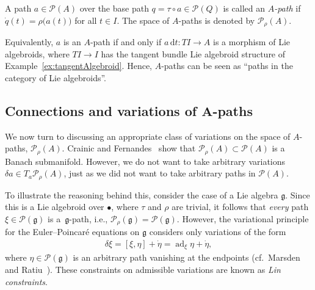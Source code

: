 \documentclass[10pt,a4paper]{amsart}
\numberwithin{equation}{section}
\begin{document}
\begin{Definition} \label{def:a-path}
A path $ a \in \mathcal{P} (A) $ over the base path $ q = \tau \circ a \in \mathcal{P} (Q) $ is called an \emph{$A$-path} if $ \dot{q} (t) = \rho \bigl( a (t) \bigr) $ for all $ t \in I $. The space of $A$-paths is denoted by $ \mathcal{P} _\rho (A) $.
\end{Definition}

\begin{Remark}
Equivalently, $a$ is an $A$-path if and only if $ a \,\mathrm{d}t \colon T I \rightarrow A $ is a morphism of Lie algebroids, where $ T I \rightarrow I $ has the tangent bundle Lie algebroid structure of Example~\ref{ex:tangentAlgebroid}. Hence, $A$-paths can be seen as ``paths in the category of Lie
 algebroids''.
\end{Remark}

\subsection[Connections and variations of $A$-paths]{Connections and variations of $\boldsymbol{A}$-paths}

We now turn to discussing an appropriate class of variations on the space of $A$-paths, $ \mathcal{P} _\rho (A) $. Crainic and Fernandes~\cite[Lemma~4.6]{CrFe2003} show that $ \mathcal{P} _\rho (A) \subset \mathcal{P} (A) $ is a Banach submanifold. However, we do not want to take arbitrary variations $ \delta a \in T _a \mathcal{P} _\rho (A) $, just as we did not want to take arbitrary paths in $ \mathcal{P} (A) $.

To illustrate the reasoning behind this, consider the case of a Lie algebra $ \mathfrak{g} $. Since this is a Lie algebroid over $ \bullet $, where $\tau$ and $\rho$ are trivial, it follows that \emph{every} path $ \xi \in \mathcal{P} ( \mathfrak{g} ) $ is a~$ \mathfrak{g} $-path, i.e., $ \mathcal{P} _\rho ( \mathfrak{g} ) = \mathcal{P} (\mathfrak{g} )$. However, the variational principle for the Euler--Poincar\'e equations on $ \mathfrak{g} $ considers only variations of the form
\begin{gather*}
 \delta \xi = [ \xi, \eta ] + \dot{ \eta } = \operatorname{ad} _\xi \eta + \dot{ \eta } ,
\end{gather*}
where $ \eta \in \mathcal{P} ( \mathfrak{g} ) $ is an arbitrary path vanishing at the endpoints (cf.\ Marsden and Ratiu~\cite[Chapter~13]{MaRa1999}). These constraints on admissible variations are known as \emph{Lin constraints}.
\end{document}
